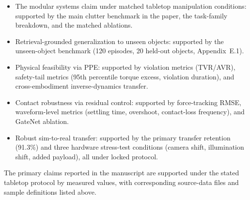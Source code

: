 \documentclass[11pt]{article}
\begin{document}
\begin{itemize}[leftmargin=1.5em]
\item The modular systems claim under matched tabletop manipulation conditions: supported by the main clutter benchmark in the paper, the task-family breakdown, and the matched ablations.
\item Retrieval-grounded generalization to unseen objects: supported by the unseen-object benchmark (120 episodes, 20 held-out objects, Appendix~E.1).
\item Physical feasibility via PPE: supported by violation metrics (TVR/AVR), safety-tail metrics (95th percentile torque excess, violation duration), and cross-embodiment inverse-dynamics transfer.
\item Contact robustness via residual control: supported by force-tracking RMSE, waveform-level metrics (settling time, overshoot, contact-loss frequency), and GateNet ablation.
\item Robust sim-to-real transfer: supported by the primary transfer retention (91.3\%) and three hardware stress-test conditions (camera shift, illumination shift, added payload), all under locked protocol.
\end{itemize}

The primary claims reported in the manuscript are supported under the stated tabletop protocol by measured values, with corresponding source-data files and sample definitions listed above.
\end{document}
